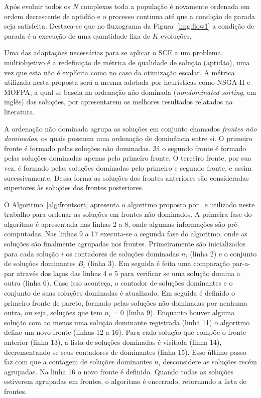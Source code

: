 Após evoluir todos os $N$ complexos toda a população é novamente ordenada
em ordem decrescente de aptidão e o processo continua até que a condição
de parada seja satisfeita.
Destaca-se que no fluxograma da Figura~\ref{img:flow1} a condição de parada é a
execução de uma quantidade fixa de $K$ evoluções.

Uma das adaptações necessárias para se aplicar o SCE a um problema multiobjetivo
é a redefinição de métrica de qualidade de solução (aptidão),
uma vez que esta não é explícita como no caso da otimização escalar.
A métrica utilizada nesta proposta será a mesma adotada por heurísticas como NSGA-II e MOFPA,
a qual se baseia na ordenação não dominada (\emph{nondominated sorting}, em inglês)
das soluções, por apresentarem os melhores resultados relatados na literatura.

A ordenação não dominada agrupa as soluções em conjunto chamados \emph{frontes não dominados},
os quais possuem uma ordenação de dominância entre si. O primeiro fronte é formado
pelas soluções não dominadas.
Já o segundo fronte é formado pelas soluções dominadas apenas pelo primeiro fronte.
O terceiro fronte, por sua vez, é formado pelas soluções dominadas pelo primeiro
e segundo fronte, e assim sucessivamente.
Dessa forma as soluções dos frontes anteriores são consideradas superiores às soluções
dos frontes posteriores.

O Algoritmo~\ref{alg:frontsort} apresenta o algoritmo proposto por~\cite{deb2002fast}
e utilizado neste trabalho para ordenar as soluções em frontes não dominados.
A primeira fase do algoritmo é apresentada nas linhas 2 a 8,
onde algumas informações são pré-computadas.
Nas linhas 9 a 17 executa-se a segunda fase do algoritmo, onde as soluções são finalmente agrupadas
nos frontes.
Primeiramente são inicializados para cada solução $i$
os contadores de soluções dominadas $n_i$ (linha 2) e
o conjunto de soluções dominantes $B_i$ (linha 3).
Em seguida é feita uma comparação par-a-par através dos laços das linhas 4 e 5
para verificar se uma solução domina a outra (linha 6).
Caso isso aconteça, o contador de soluções dominantes e o conjunto de suas soluções dominadas
é atualizado.
Em seguida é definido o primeiro fronte de pareto, formado pelas soluções
não dominadas por nenhuma outra, ou seja, soluções que tem $n_i = 0$ (linha 9).
Enquanto houver alguma solução com ao menos uma solução dominante registrada (linha 11)
o algoritmo define um novo fronte (linhas 12 a 16).
Para cada solução que compõe o fronte anterior (linha 13), a lista de soluções dominadas
é visitada (linha 14), decrementando-se seus contadores de dominantes (linha 15).
Esse último passo faz com que a contagem de soluções dominantes $n_i$ desconsidere
as soluções recém agrupadas.
Na linha 16 o novo fronte é definido.
Quando todas as soluções estiverem agrupadas em frontes, o algoritmo é encerrado,
retornando a lista de frontes.

